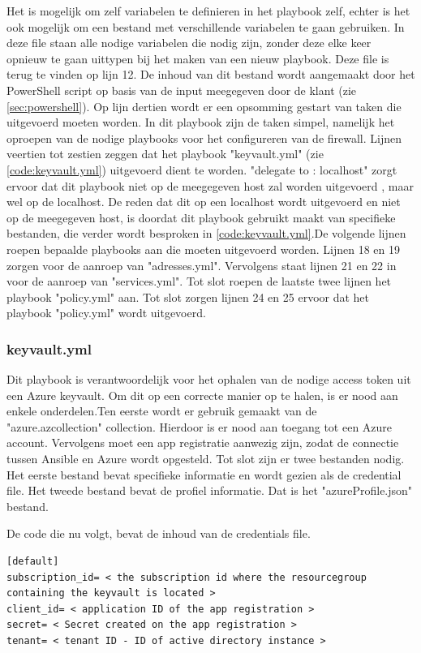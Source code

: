 Het is mogelijk om zelf variabelen te definieren in het playbook zelf, echter is het ook mogelijk om een bestand met verschillende variabelen te gaan gebruiken. In deze file staan alle nodige variabelen die nodig zijn, zonder deze elke keer opnieuw te gaan uittypen bij het maken van een nieuw playbook. Deze file is terug te vinden op lijn 12. De inhoud van dit bestand wordt aangemaakt door het PowerShell script op basis van de input meegegeven door de klant (zie \ref{sec:powershell}). Op lijn dertien wordt er een opsomming gestart van taken die uitgevoerd moeten worden. In dit playbook zijn de taken simpel, namelijk het oproepen van de nodige playbooks voor het configureren van de firewall. Lijnen veertien tot zestien zeggen dat het playbook "keyvault.yml" (zie \ref{code:keyvault.yml}) uitgevoerd dient te worden. "delegate \textunderscore to : localhost" zorgt ervoor dat dit playbook niet op de meegegeven host zal worden uitgevoerd , maar wel op de localhost. De reden dat dit op een localhost wordt uitgevoerd en niet op de meegegeven host, is doordat dit playbook gebruikt maakt van specifieke bestanden, die verder wordt besproken  in \ref{code:keyvault.yml}.De volgende lijnen roepen bepaalde playbooks aan die moeten uitgevoerd worden. Lijnen 18 en 19 zorgen voor de aanroep van "adresses.yml". Vervolgens staat lijnen 21 en 22 in voor de aanroep van "services.yml". Tot slot roepen de laatste twee lijnen het playbook "policy.yml" aan. Tot slot zorgen lijnen 24 en 25 ervoor dat het playbook "policy.yml" wordt uitgevoerd.
\subsubsection{keyvault.yml}
\label{subsub:keyvault.yml}
Dit playbook is verantwoordelijk voor het ophalen van de nodige access token uit een Azure keyvault. Om dit op een correcte manier op te halen, is er nood aan enkele onderdelen.Ten eerste wordt er gebruik gemaakt van de "azure.azcollection" collection. Hierdoor is er nood aan toegang tot een Azure account. Vervolgens moet een app registratie aanwezig zijn, zodat de connectie tussen Ansible en Azure wordt opgesteld. Tot slot zijn er twee bestanden nodig. Het eerste bestand bevat specifieke informatie en wordt gezien als de credential file. Het tweede bestand bevat de profiel informatie. Dat is het "azureProfile.json" bestand. 

De code die nu volgt, bevat de inhoud van de credentials file. 

\begin{lstlisting}[caption={Credentials file}]
[default]
subscription_id= < the subscription id where the resourcegroup containing the keyvault is located > 
client_id= < application ID of the app registration >
secret= < Secret created on the app registration > 
tenant= < tenant ID - ID of active directory instance > 
\end{lstlisting}

